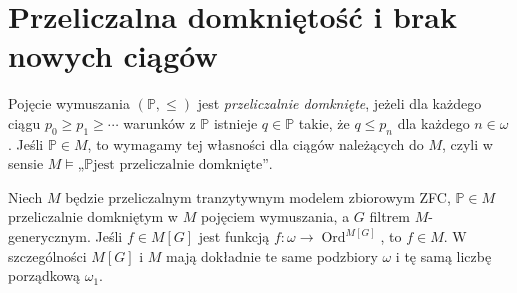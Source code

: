 \section{Przeliczalna domkniętość i brak nowych ciągów}

\begin{definicja}
\label{def:forcing34-countably-closed}
Pojęcie wymuszania $(\mathbb P,\leq)$
jest \emph{przeliczalnie domknięte},
jeżeli dla każdego ciągu
$p_0\geq p_1\geq\cdots$
warunków z $\mathbb P$
istnieje $q\in\mathbb P$
takie, że $q\leq p_n$
dla każdego $n\in\omega$.
Jeśli $\mathbb P\in M$, to
wymagamy tej własności dla
ciągów należących do $M$,
czyli w sensie
$M\models\text{„$\mathbb P$
jest przeliczalnie domknięte”}$.
\end{definicja}

\begin{lemat}
\label{lem:forcing34-closed-no-sequences}
Niech $M$ będzie przeliczalnym
tranzytywnym modelem zbiorowym ZFC,
$\mathbb P\in M$ przeliczalnie
domkniętym w $M$ pojęciem
wymuszania, a $G$ filtrem
$M$-generycznym. Jeśli
$f\in M[G]$ jest funkcją
$f:\omega\to\operatorname{Ord}^{M[G]}$,
to $f\in M$. W szczególności
$M[G]$ i $M$ mają dokładnie
te same podzbiory $\omega$
i tę samą liczbę porządkową
$\omega_1$.
\end{lemat}
